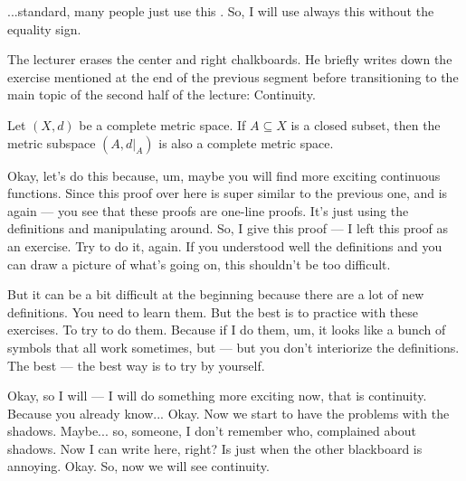 \begin{spoken-clean}[00:00:00 - 00:00:08]
...standard, many people just use this . So, I will use always this  without the equality sign. 
\end{spoken-clean}

\begin{meta-note}
The lecturer erases the center and right chalkboards. He briefly writes down the exercise mentioned at the end of the previous segment before transitioning to the main topic of the second half of the lecture: Continuity.
\end{meta-note}

\begin{nice-box}[Exercise] %
\setcounter{theorem}{48}
\begin{proposition}\label{prop:closed-subset-complete-v2}
Let $(X, d)$ be a complete metric space. If $A \subseteq X$ is a closed subset, then the metric subspace $(A, d|_A)$ is also a complete metric space.
\end{proposition}
\end{nice-box}

\begin{spoken-clean}[00:00:24 - 00:01:25]
Okay, let's do this because, um, maybe you will find more exciting continuous functions. Since this proof over here  is super similar to the previous one, and is again --- you see that these proofs are one-line proofs. It's just using the definitions and manipulating around. So, I give this proof --- I left this proof as an exercise. Try to do it, again. If you understood well the definitions and you can draw a picture of what's going on, this shouldn't be too difficult. 

But it can be a bit difficult at the beginning because there are a lot of new definitions. You need to learn them. But the best is to practice with these exercises. To try to do them. Because if I do them, um, it looks like a bunch of symbols that all work sometimes, but --- but you don't interiorize the definitions. The best --- the best way is to try by yourself.
\end{spoken-clean}

\begin{spoken-clean}[00:01:25 - 00:03:41]
Okay, so I will --- I will do something more exciting now, that is continuity. Because you already know...  Okay. Now we start to have the problems with the shadows. Maybe... so, someone, I don't remember who, complained about shadows. Now I can write here, right? Is just when the other blackboard is annoying. Okay. So, now we will see continuity.
\end{spoken-clean}

